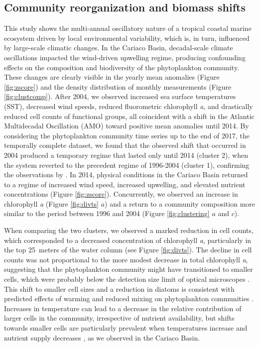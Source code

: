 \documentclass[draft]{agujournal2019}
\begin{document}
\subsection{Community reorganization and biomass shifts}
    This study shows the multi-annual oscillatory nature of a tropical coastal marine ecosystem driven by local environmental variability, which is, in turn, influenced by large-scale climatic changes. In the Cariaco Basin, decadal-scale climate oscillations impacted the wind-driven upwelling regime, producing confounding effects on the composition and biodiversity of the phytoplankton community.
    These changes are clearly visible in the yearly mean anomalies (Figure \ref{fig:zscore}) and the density distribution of monthly measurements (Figure \ref{fig:clustcomp}). After 2004, we observed increased sea surface temperatures (SST), decreased wind speeds, reduced fluorometric chlorophyll \textit{a}, and drastically reduced cell counts of functional groups, all coincident with a shift in the Atlantic Multidecadal Oscillation (AMO) toward positive mean anomalies until 2014. 
    By considering the phytoplankton community time series up to the end of 2017, the temporally complete dataset, we found that the observed shift that occurred in 2004 produced a temporary regime that lasted only until 2014 (cluster 2), when the system reverted to the precedent regime of 1996-2004 (cluster 1), confirming the observations by . In 2014, physical conditions in the Cariaco Basin returned to a regime of increased wind speed, increased upwelling, and elevated nutrient concentrations (Figure \ref{fig:zscore}). Concurrently, we observed an increase in chlorophyll \textit{a} (Figure \ref{fig:divts} $a$) and a return to a community composition more similar to the period between 1996 and 2004 (Figure \ref{fig:clustering} $a$ and $c$).
    
    When comparing the two clusters, we observed a marked reduction in cell counts, which corresponded to a decreased concentration of chlorophyll \textit{a}, particularly in the top \qty{25}{meters} of the water column (see Figure \ref{fig:divts}). The decline in cell counts was not proportional to the more modest decrease in total chlorophyll \textit{a}, suggesting that the phytoplankton community might have transitioned to smaller cells, which were probably below the detection size limit of optical microscopes \cite{muller-karger_scientific_2019}. This shift to smaller cell sizes and a reduction in diatoms is consistent with predicted effects of warming and reduced mixing on phytoplankton communities \cite{bopp_response_2005}. Increases in temperature can lead to a decrease in the relative contribution of larger cells in the community, irrespective of nutrient availability, but shifts towards smaller cells are particularly prevalent when temperatures increase and nutrient supply decreases \cite{acevedo-trejos_glimpse_2014, mousing_global_2014}, as we observed in the Cariaco Basin. 
    
\end{document}
